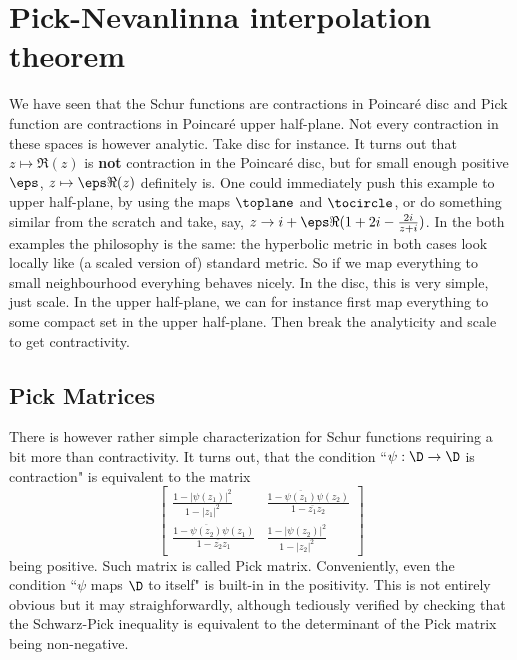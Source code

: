 \section{Pick-Nevanlinna interpolation theorem}

We have seen that the Schur functions are contractions in Poincaré disc and Pick function are contractions in Poincaré upper half-plane. Not every contraction in these spaces is however analytic. Take disc for instance. It turns out that $z \mapsto \Re(z)$ is \textbf{not} contraction in the Poincaré disc, but for small enough positive $\eps$, $z \mapsto \eps \Re(z)$ definitely is. One could immediately push this example to upper half-plane, by using the maps $\toplane$ and $\tocircle$, or do something similar from the scratch and take, say, $z \to i + \eps \Re(1 + 2 i - \frac{2 i}{z + i})$. In the both examples the philosophy is the same: the hyperbolic metric in both cases look locally like (a scaled version of) standard metric. So if we map everything to small neighbourhood everyhing behaves nicely. In the disc, this is very simple, just scale. In the upper half-plane, we can for instance first map everything to some compact set in the upper half-plane. Then break the analyticity and scale to get contractivity.

\subsection{Pick Matrices}

There is however rather simple characterization for Schur functions requiring a bit more than contractivity. It turns out, that the condition ``$\psi : \D \to \D$ is contraction" is equivalent to the matrix
\[
	\begin{bmatrix}
		\frac{1 - |\psi(z_{1})|^{2}}{1 - |z_{1}|^{2}} & \frac{1 - \overline{\psi(z_{1})} \psi(z_{2})}{1 - \overline{z_{1}} z_{2}} \\
		\frac{1 - \overline{\psi(z_{2})} \psi(z_{1})}{1 - \overline{z_{2}} z_{1}} & \frac{1 - |\psi(z_{2})|^{2}}{1 - |z_{2}|^{2}}
	\end{bmatrix}
\]
being positive. Such matrix is called Pick matrix. Conveniently, even the condition ``$\psi$ maps $\D$ to itself" is built-in in the positivity. This is not entirely obvious but it may straighforwardly, although tediously verified by checking that the Schwarz-Pick inequality is equivalent to the determinant of the Pick matrix being non-negative.

